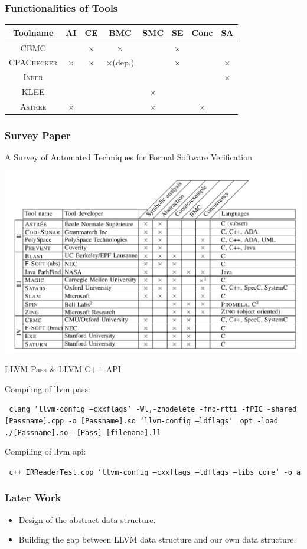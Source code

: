 \documentclass[11pt]{beamer}
\begin{document}
\begin{frame}\frametitle{Functionalities of Tools}
\begin{tabular}{c|c|c|c|c|c|c|c}
Toolname & AI & CE & BMC & SMC & SE & Conc & SA\\
\hline 
\textsc{CBMC} & & $\times$ & $\times$ & &$\times$& &\\
\textsc{CPAChecker} & $\times$ & $\times$ & $\times$(dep.) & & $\times$ & & $\times$\\
\textsc{Infer} & & & & & & &$\times$\\
\textsc{KLEE} & & & & $\times$ & &\\
\textsc{Astree} &$\times$& & & $\times$ & &$\times$\\ 


\end{tabular}
\end{frame}

\begin{frame}\frametitle{Survey Paper}
A Survey of Automated Techniques for
Formal Software Verification
\begin{center}
\includegraphics[scale=0.24]{table.png}
\end{center}
\end{frame}
\begin{frame}
\begin{center}
LLVM Pass \& LLVM C++ API


\end{center}
Compiling of llvm pass:

\texttt{
clang `llvm-config --cxxflags` -Wl,-znodelete -fno-rtti -fPIC -shared [Passname].cpp -o [Passname].so `llvm-config --ldflags`
}
\texttt{opt -load ./[Passname].so -[Pass] [filename].ll}

Compiling of llvm api:

\texttt{ c++ IRReaderTest.cpp `llvm-config --cxxflags --ldflags --libs core` -o a}
\end{frame}

\begin{frame}\frametitle{Later Work}
\begin{itemize}
\item Design of the abstract data structure.

\item Building the gap between LLVM data structure and our own data structure.
\end{itemize}
\end{frame}
\end{document}
